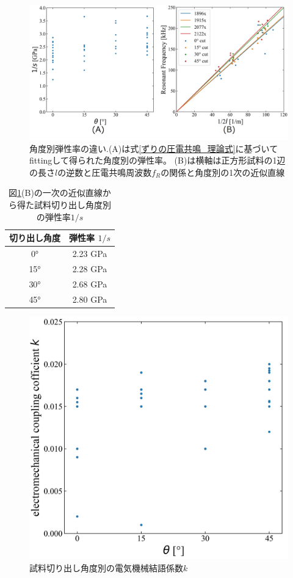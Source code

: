 \documentclass[dvipdfmx,12pt,a4paper]{jreport}
\begin{document}
			\begin{figure}[H]
				\centering
				\includegraphics[width=\linewidth]{弾性率_角度依存性.jpg}
				\caption{角度別弾性率の違い.(A)は式\ref{ずりの圧電共鳴_理論式}に基づいてfittingして得られた角度別の弾性率。
				(B)は横軸は正方形試料の1辺の長さ$l$の逆数と圧電共鳴周波数$f_R$の関係と角度別の1次の近似直線}
				\label{弾性率_角度依存性}
			\end{figure}
			\newpage
			\begin{table}[h]
				\centering
				\caption{図\ref{弾性率_角度依存性}(B)の一次の近似直線から得た試料切り出し角度別の弾性率$1/s$}
				\label{角度別_弾性率}
				\begin{tabular}{cc} \hline
					切り出し角度 & 弾性率 $1/s$ \\ \hline
					0°	& 2.23 GPa\\
					15° & 2.28 GPa\\
					30° & 2.68 GPa\\
					45° & 2.80 GPa\\ \hline
				\end{tabular}
			\end{table}
			\begin{figure}[h]
				\centering
				\includegraphics{電気機械結合係数の角度依存性.jpg}
				\caption{試料切り出し角度別の電気機械結語係数$k$}
				\label{角度別電気機械結合係数}
			\end{figure}
			\newpage
\end{document}
